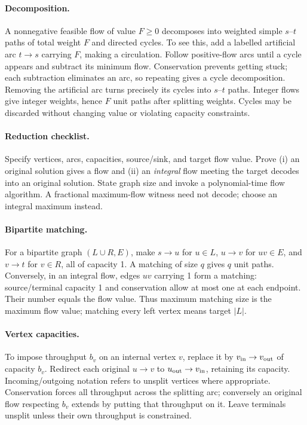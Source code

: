\documentclass[10pt]{article}
\theoremstyle{definition}
\begin{document}
\paragraph{Decomposition.}
A nonnegative feasible flow of value $F\ge0$ decomposes into weighted simple
$s$--$t$ paths of total weight $F$ and directed cycles. To see this, add a
labelled artificial arc $t\to s$ carrying $F$, making a circulation.
Follow positive-flow arcs until a cycle appears and subtract its minimum
flow. Conservation prevents getting stuck; each subtraction eliminates an
arc, so repeating gives a cycle decomposition. Removing the artificial arc
turns precisely its cycles into $s$--$t$ paths. Integer flows give integer
weights, hence $F$ unit paths after splitting weights. Cycles may be discarded
without changing value or violating capacity constraints.

\paragraph{Reduction checklist.}
Specify vertices, arcs, capacities, source/sink, and target flow value.
Prove (i) an original solution gives a flow and (ii) an \emph{integral} flow
meeting the target decodes into an original solution. State graph size and
invoke a polynomial-time flow algorithm. A fractional maximum-flow witness
need not decode; choose an integral maximum instead.

\paragraph{Bipartite matching.}
For a bipartite graph $(L\cup R,E)$, make
$s\to u$ for $u\in L$, $u\to v$ for $uv\in E$, and $v\to t$ for $v\in R$,
all of capacity 1. A matching of size $q$ gives $q$ unit paths.
Conversely, in an integral flow, edges $uv$ carrying 1 form a matching:
source/terminal capacity 1 and conservation allow at most one at each
endpoint. Their number equals the flow value. Thus maximum matching size is
the maximum flow value; matching every left vertex means target $|L|$.

\paragraph{Vertex capacities.}
To impose throughput $b_v$ on an internal vertex $v$, replace it by
$v_{\rm in}\to v_{\rm out}$ of capacity $b_v$. Redirect each original
$u\to v$ to $u_{\rm out}\to v_{\rm in}$, retaining its capacity.
Incoming/outgoing notation refers to unsplit vertices where appropriate.
Conservation forces all throughput across the splitting arc; conversely an
original flow respecting $b_v$ extends by putting that throughput on it.
Leave terminals unsplit unless their own throughput is constrained.
\end{document}
